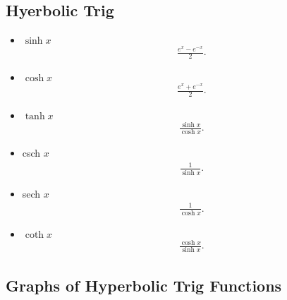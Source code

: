 \documentclass{report}
\begin{document}
     \subsection{Hyerbolic Trig}
    \begin{itemize}
      \item $\sinh{x}$
        \begin{align*}
          \frac{e^{x}-e^{-x}}{2}
        .\end{align*}
      \item $\cosh{x}$
        \begin{align*}
          \frac{e^{x}+e^{-x}}{2}
        .\end{align*}
      \item $ \tanh{x} $
        \begin{align*}
          \frac{\sinh{x}}{\cosh{x}}
        .\end{align*}
      \item csch $x$
        \begin{align*}
          \frac{1}{\sinh{x}}
        .\end{align*}
      \item sech $x$
        \begin{align*}
          \frac{1}{\cosh{x}}
        .\end{align*}
      \item $\coth{x}$
        \begin{align*}
          \frac{\cosh{x}}{\sinh{x}}
        .\end{align*}
    \end{itemize}

    \pagebreak \bigbreak \noindent
    \subsection{Graphs of Hyperbolic Trig Functions}
    \bigbreak \noindent \bigbreak \noindent
    \begin{figure}[ht]
        \centering
        \label{fig:sinhx}
    \end{figure}
    \begin{figure}[ht]
        \centering
        \label{fig:tanhx}
    \end{figure}
    \begin{figure}[h]
        \centering
        \label{fig:csch}
    \end{figure}
\end{document}
